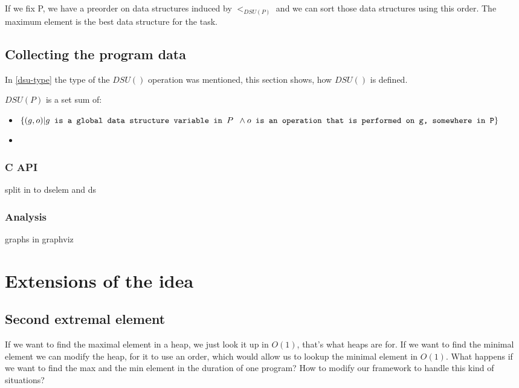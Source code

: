 \documentclass[11pt]{article}
\begin{document}
		If we fix P, we have a preorder on data structures induced by $<_{DSU(P)}$ and we can sort those data
		structures using this order. The maximum element is the best data structure for the task.

	\subsection{Collecting the program data} \label{dsu-definition}

		In \ref{dsu-type} the type of the $DSU()$ operation was mentioned, this section shows, how $DSU()$ is
		defined.

		$DSU(P)$ is a set sum of:

		\begin{itemize}

			\item $\{(g, o) | g \texttt{ is a global data structure variable in $P$ } \wedge \\ o \texttt{
				is an operation that is performed on g, somewhere in P} \}$

			\item

		\end{itemize}

		\subsubsection{C API}
			split in to dselem and ds

		\subsubsection{Analysis}

			graphs in graphviz

\pagebreak

\section{Extensions of the idea}

	\subsection{Second extremal element}

		If we want to find the maximal element in a heap, we just look it up in $O(1)$, that's what heaps are
		for.  If we want to find the minimal element we can modify the heap, for it to use an order, which would
		allow us to lookup the minimal element in $O(1)$.  What happens if we want to find the max and the min
		element in the duration of one program?  How to modify our framework to handle this kind of situations?
\end{document}
